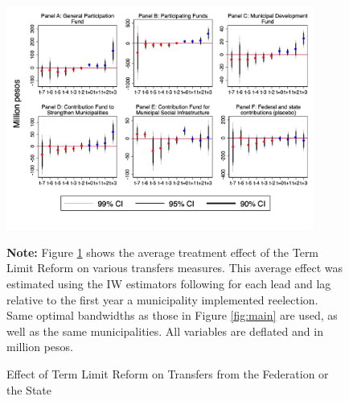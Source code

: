 \documentclass[12pt]{amsart}
\numberwithin{equation}{section}
\theoremstyle{definition}
\theoremstyle{definition}
\theoremstyle{definition}
\begin{document}
 \begin{figure}[h]   
\centering
 \caption{Effect of Term Limit Reform on Transfers from the Federation or the State}
 \label{fig:resources2}
\includegraphics[width=0.9\textwidth]{../Figures/resouce_based_incumbency_allyears.png}
       \captionsetup{justification=centering}
         
 \textbf{Note:} Figure \ref{fig:resources2} shows the average treatment effect of the Term Limit Reform on various transfers measures. This average effect was estimated using the IW estimators following \citet{abraham_sun_2020} for each lead and lag relative to the first year a municipality implemented reelection. Same optimal bandwidths as those in Figure \ref{fig:main} are used, as well as the same municipalities. All variables are deflated and in million pesos.   
       
\end{figure}  
\end{document}

